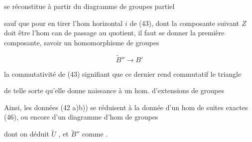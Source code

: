 
 se réconstitue à partir du diagramme de groupes partiel


sauf que pour en tirer l'hom horizontal $i$ de (43), dont la composante suivant $Z$ doit être l'hom can de passage au quotient, il faut se donner la première composante, savoir un homomorphisme de groupes

\[ \widetilde B''\longrightarrow B' \]

la commutativité de (43) signifiant que ce dernier rend commutatif le triangle


de telle sorte qu'elle donne  naissance à un hom. d'extensions de groupes


Ainsi, les données (42 a)b)) se réduisent à la donnée d'un hom de suites exactes (46), ou encore d'un diagramme d'hom de groupes



dont on déduit $\widetilde U$ , et $\widetilde B''$ comme .

